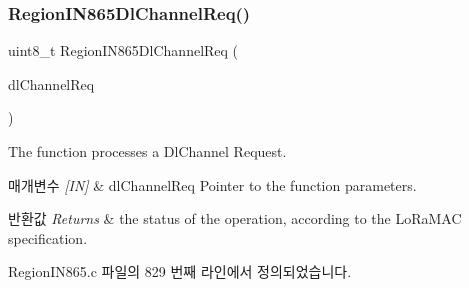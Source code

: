 \subsubsection{\texorpdfstring{Region\+I\+N865\+Dl\+Channel\+Req()}{RegionIN865DlChannelReq()}}
{\footnotesize\ttfamily uint8\+\_\+t Region\+I\+N865\+Dl\+Channel\+Req (\begin{DoxyParamCaption}\item[{\mbox{\hyperlink{group___r_e_g_i_o_n_gae0d608ff1f8ea0a430e4f9a4c38ec7f3}{Dl\+Channel\+Req\+Params\+\_\+t}} $\ast$}]{dl\+Channel\+Req }\end{DoxyParamCaption})}



The function processes a Dl\+Channel Request. 


\begin{DoxyParams}{매개변수}
{\em \mbox{[}\+I\+N\mbox{]}} & dl\+Channel\+Req Pointer to the function parameters.\\
\hline
\end{DoxyParams}

\begin{DoxyRetVals}{반환값}
{\em Returns} & the status of the operation, according to the Lo\+Ra\+M\+AC specification. \\
\hline
\end{DoxyRetVals}


Region\+I\+N865.\+c 파일의 829 번째 라인에서 정의되었습니다.



